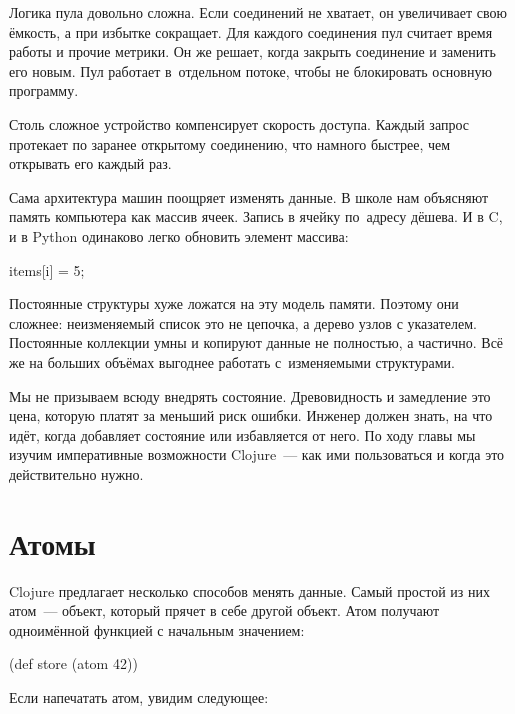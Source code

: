 Логика пула довольно сложна. Если соединений не хватает, он увеличивает свою
ёмкость, а при избытке сокращает. Для каждого соединения пул считает время
работы и прочие метрики. Он же решает, когда закрыть соединение и заменить его
новым. Пул работает в~отдельном потоке, чтобы не блокировать основную программу.

Столь сложное устройство компенсирует скорость доступа. Каждый запрос протекает
по заранее открытому соединению, что намного быстрее, чем открывать его каждый
раз.

Сама архитектура машин поощряет изменять данные. В школе нам объясняют память
компьютера как массив ячеек. Запись в ячейку по~адресу дёшева. И в C\Plus\Plus,
и в Python одинаково легко обновить элемент массива:

\begin{english}
  \begin{python}
items[i] = 5;
  \end{python}
\end{english}

Постоянные структуры хуже ложатся на эту модель памяти. Поэтому они сложнее:
неизменяемый список это не цепочка, а дерево узлов с указателем. Постоянные
коллекции умны и копируют данные не полностью, а частично. Всё же на больших
объёмах выгоднее работать с~изменяемыми структурами.

Мы не призываем всюду внедрять состояние. Древовидность и замедление это цена,
которую платят за меньший риск ошибки. Инженер должен знать, на что идёт,
когда добавляет состояние или избавляется от него. По ходу главы мы изучим
императивные возможности Clojure~--- как ими пользоваться и когда это
действительно нужно.

\section{Атомы}


Clojure предлагает несколько способов менять данные. Самый простой из них
атом~--- объект, который прячет в себе другой объект. Атом получают
одноимённой функцией с начальным значением:

\begin{english}
  \begin{clojure}
(def store (atom 42))
  \end{clojure}
\end{english}

\noindent
Если напечатать атом, увидим следующее:

